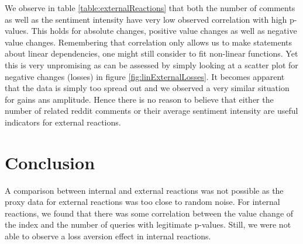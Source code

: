 \documentclass[12pt]{article}
\begin{document}
We observe in table \ref{table:externalReactions} that both the number of comments as well as the sentiment intensity have very low observed correlation with high p-values. This holds for absolute changes, positive value changes as well as negative value changes. Remembering that correlation only allows us to make statements about linear dependencies, one might still consider to fit non-linear functions. Yet this is very unpromising as can be assessed by simply looking at a scatter plot for negative changes (losses) in figure \ref{fig:linExternalLosses}. It becomes apparent that the data is simply too spread out and we observed a very similar situation for gains ans amplitude. Hence there is no reason to believe that either the number of related reddit comments or their average sentiment intensity are useful indicators for external reactions.



\section{Conclusion}

A comparison between internal and external reactions was not possible as the proxy data for external reactions was too close to random noise. For internal reactions, we found that there was some correlation between the value change of the index and the number of queries with legitimate p-values. Still, we were not able to observe a loss aversion effect in internal reactions.
\end{document}
